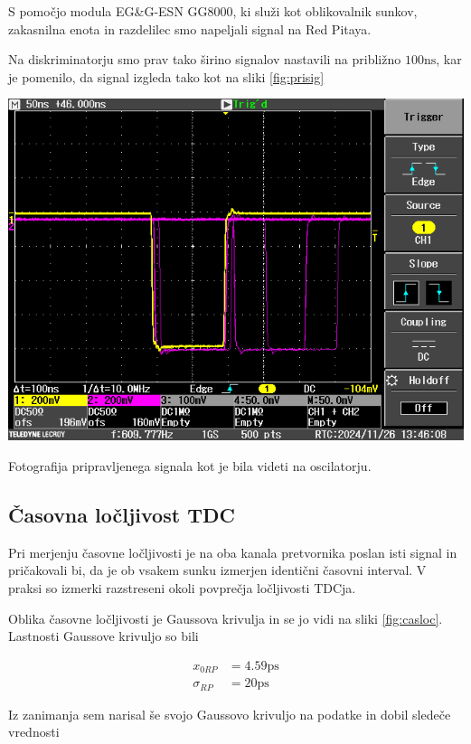 \documentclass[11pt]{article}
\begin{document}
S pomočjo modula EG\&G-ESN GG8000, ki služi kot oblikovalnik sunkov, zakasnilna enota in razdelilec smo napeljali signal na Red Pitaya.

Na diskriminatorju smo prav tako širino signalov nastavili na približno \(100 \mathrm{ns}\), kar je pomenilo, da signal izgleda tako kot na sliki \ref{fig:prisig}

\begin{slika}[H]
  \centering
  \includegraphics[width=.9\linewidth]{figures/pripravljen_signal.png}
  \caption{\small Fotografija pripravljenega signala kot je bila videti na oscilatorju.}\label{fig:prisig}
\end{slika}

\subsection{Časovna ločljivost TDC}\label{sec:org81fd923}

Pri merjenju časovne ločljivosti je na oba kanala pretvornika poslan isti signal in pričakovali bi, da je ob vsakem sunku izmerjen identični časovni interval. V praksi so izmerki razstreseni okoli povprečja ločljivosti TDCja.

Oblika časovne ločljivosti je Gaussova krivulja in se jo vidi na sliki \ref{fig:casloc}. Lastnosti Gaussove krivuljo so bili

\begin{align*}
x_{0RP} &= 4.59 \mathrm{ps} \\
\sigma_{RP} &= 20 \mathrm{ps}
\end{align*}

Iz zanimanja sem narisal še svojo Gaussovo krivuljo na podatke in dobil sledeče vrednosti
\end{document}

